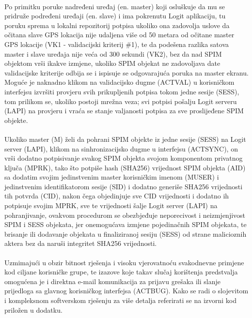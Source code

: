 \paragraph*{}
Po primitku poruke nadređeni uređaj (en. master) koji osluškuje da mu se pridruže podređeni uređaji (en. slave) i ima pokrenutu Logit aplikaciju, tu poruku sprema u lokalni repozitorij potpisa ukoliko ona zadovolja uslove da očitana slave GPS lokacija nije udaljena više od 50 metara od očitane master GPS lokacije (VK1 - validacijski kriterij \#1), te da podešena razlika satova master i slave uređaja nije veća od 300 sekundi (VK2), bez da nad SPIM objektom vrši ikakve izmjene, ukoliko SPIM objekat ne zadovoljava date validacijske kriterije odbija se i ispisuje se odgovarajuća poruka na master ekranu. Moguće je naknadno klikom na validacijsko dugme (ACTVAL) u korisničkom interfejsu izvršiti provjeru svih prikupljenih potpisa tokom jedne sesije (SESS), tom prilikom se, ukoliko postoji mrežna veza; svi potpisi pošalju Logit serveru (LAPI) na provjeru i vraća se stanje valjanosti potpisa za sve proslijeđene SPIM objekte.

\paragraph*{}
Ukoliko master (M) želi da pohrani SPIM objekte iz jedne sesije (SESS) na Logit server (LAPI), klikom na sinhronizacijsko dugme u interfejsu (ACTSYNC), on vrši dodatno potpisivanje svakog SPIM objekta svojom komponentom privatnog ključa (MPRK), tako što potpiše hash (SHA256) vrijednost SPIM objekta (AID) sa dodatim svojim jedinstvenim master korisničkim imenom (MUSER) i jedinstvenim identifikatorom sesije (SID) i dodatno generiše SHA256 vrijednosti tih potvrda (CID), nakon čega objedinjuje sve CID vrijednosti i dodatno ih potpisuje svojim MPRK, sve te vrijednosti šalje Logit server (LAPI) na pohranjivanje, ovakvom procedurom se obezbjeđuje neporecivost i neizmjenjivost SPIM i SESS objekata, jer onemogućava izmjene pojedinačnih SPIM objekata, te brisanje ili dodavanje objekata u finaliziranoj sesiju (SESS) od strane malicioznih aktera bez da naruši integritet SHA256 vrijednosti.

\paragraph*{}
Uzmimajući u obzir bitnost rješenja i visoku vjerovatnoću svakodnevne primjene kod ciljane korisničke grupe, te izazove koje takav slučaj korištenja predstvalja omogućena je i direktna e-mail komunikacija za prijavu grešaka ili slanje prijedloga sa glavnog korisničkog interfejsa (ACTBUG). Kako se radi o slojevitom i kompleksnom softverskom rješenju za više detalja referirati se na izvorni kod priložen u dodatku.

